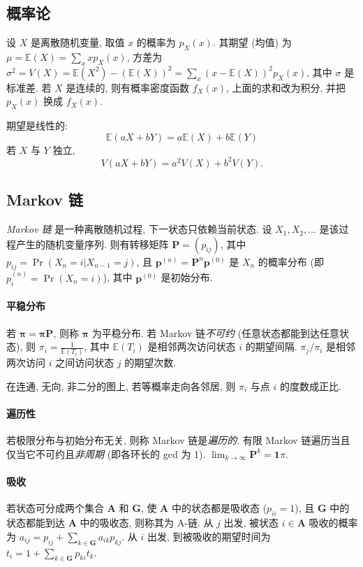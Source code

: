 

\subsection{概率论}
设 $X$ 是离散随机变量, 取值 $x$ 的概率为 $p_X(x)$. 其期望 (均值) 为 $\mu=\mathbb{E}(X)=\sum_xxp_X(x)$, 方差为 $\sigma^2=V(X)=\mathbb{E}(X^2)-(\mathbb{E}(X))^2=\sum_x(x-\mathbb{E}(X))^2p_X(x)$, 其中 $\sigma$ 是标准差. 若 $X$ 是连续的, 则有概率密度函数 $f_X(x)$, 上面的求和改为积分, 并把 $p_X(x)$ 换成 $f_X(x)$.

期望是线性的:
\[\mathbb{E}(aX+bY) = a\mathbb{E}(X)+b\mathbb{E}(Y)\]
若 $X$ 与 $Y$ 独立, \[V(aX+bY) = a^2V(X)+b^2V(Y).\]

\subsection{Markov 链}
\emph{Markov 链} 是一种离散随机过程, 下一状态只依赖当前状态.
设 $X_1,X_2,\ldots$ 是该过程产生的随机变量序列.
则有转移矩阵 $\mathbf{P} = (p_{ij})$, 其中 $p_{ij} = \Pr(X_n = i | X_{n-1} = j)$,
且 $\mathbf{p}^{(n)} = \mathbf P^n \mathbf p^{(0)}$ 是 $X_n$ 的概率分布 (即 $p^{(n)}_i = \Pr(X_n = i)$),
其中 $\mathbf{p}^{(0)}$ 是初始分布.

\paragraph{平稳分布}
若 $\mathbf{\pi} = \mathbf{\pi P}$, 则称 $\mathbf{\pi}$ 为平稳分布.
若 Markov 链\emph{不可约} (任意状态都能到达任意状态),
则 $\pi_i = \frac{1}{\mathbb{E}(T_i)}$, 其中 $\mathbb{E}(T_i)$ 是相邻两次访问状态 $i$ 的期望间隔.
$\pi_j/\pi_i$ 是相邻两次访问 $i$ 之间访问状态 $j$ 的期望次数.

在连通, 无向, 非二分的图上, 若等概率走向各邻居, 则 $\pi_i$ 与点 $i$ 的度数成正比.

\paragraph{遍历性}
若极限分布与初始分布无关, 则称 Markov 链是\emph{遍历的}.
有限 Markov 链遍历当且仅当它不可约且\emph{非周期} (即各环长的 gcd 为 1).
$\lim_{k\rightarrow\infty}\mathbf{P}^k = \mathbf{1}\pi$.

\paragraph{吸收}
若状态可分成两个集合 $\mathbf{A}$ 和 $\mathbf{G}$, 使 $\mathbf{A}$ 中的状态都是吸收态 ($p_{ii}=1$), 且 $\mathbf{G}$ 中的状态都能到达 $\mathbf{A}$ 中的吸收态, 则称其为 A-链.
从 $j$ 出发, 被状态 $i\in\mathbf{A}$ 吸收的概率为 $a_{ij} = p_{ij}+\sum_{k\in\mathbf{G}} a_{ik}p_{kj}$.
从 $i$ 出发, 到被吸收的期望时间为 $t_i = 1+\sum_{k\in\mathbf{G}}p_{ki}t_k$.

